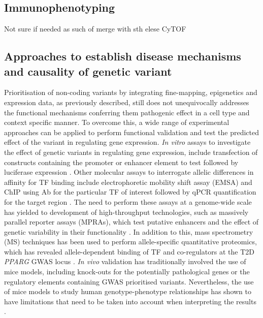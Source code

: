 
\subsection{Immunophenotyping}
Not sure if needed as such of merge with sth elese
CyTOF

\subsection{Approaches to establish disease mechanisms and causality of genetic variant}
Prioritisation of non-coding variants by integrating fine-mapping, epigenetics and expression data, as previously described, still does not unequivocally addresses the functional mechanisms conferring them pathogenic effect in a cell type and context specific manner. To overcome this, a wide range of experimental approaches can be applied to perform functional validation and test the predicted effect of the variant in regulating gene expression. 
\textit{In vitro} assays to investigate the effect of genetic variants in regulating gene expression, include transfection of constructs containing the promoter or enhancer element to test followed by luciferase expression \parencite{Niimi2002}. Other molecular assays to interrogate allelic differences in affinity for TF binding include electrophoretic mobility shift assay (EMSA) and ChIP using Ab for the particular TF of interest followed by qPCR quantification for the target region \parencite{Vernes2007}. The need to perform these assays at a genome-wide scale has yielded to development of high-throughput technologies, such as massively parallel reporter assays (MPRAs), which test putative enhancers and the effect of genetic variability in their functionality \parencite{Kheradpour2013}. In addition to this, mass spectrometry (MS) techniques has been used to perform allele-specific quantitative proteomics, which has revealed allele-dependent binding of TF and co-regulators at the T2D \textit{PPARG} GWAS locus \parencite{Lee2017}. \textit{In vivo} validation has traditionally involved the use of mice models, including knock-outs for the potentially pathological genes or the regulatory elements containing GWAS prioritised variants. Nevertheless, the use of mice models to study human genotype-phenotype relationships has shown to have limitations that need to be taken into account when interpreting the results \parencite{Ermann2012}. 

